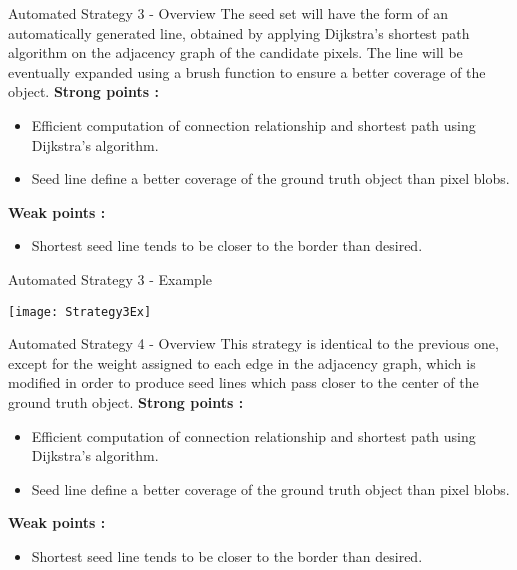 \begin{frame}[t,fragile]{Automated Strategy 3 - Overview}
The seed set will have the form of an automatically generated line, obtained by applying Dijkstra's shortest path algorithm on the adjacency graph of the candidate pixels.
The line will be eventually expanded using a brush function to ensure a better coverage of the object.\newline
\textbf{Strong points :}
\begin{itemize}
  \item Efficient computation of connection relationship and shortest path using Dijkstra's algorithm.
  \item Seed line define a better coverage of the ground truth object than pixel blobs.
\end{itemize}
\textbf{Weak points :}
\begin{itemize}
  \item Shortest seed line tends to be closer to the border than desired.
\end{itemize}
\end{frame}

\begin{frame}[t,fragile]{Automated Strategy 3 - Example}
\begin{center}
\texttt{[image: Strategy3Ex]}
\end{center}
\end{frame}

\begin{frame}[t,fragile]{Automated Strategy 4 - Overview}
This strategy is identical to the previous one, except for the weight assigned to each edge in the adjacency graph, which is modified in order to produce
seed lines which pass closer to the center of the ground truth object.\newline
\textbf{Strong points :}
\begin{itemize}
  \item Efficient computation of connection relationship and shortest path using Dijkstra's algorithm.
  \item Seed line define a better coverage of the ground truth object than pixel blobs.
\end{itemize}
\textbf{Weak points :}
\begin{itemize}
  \item Shortest seed line tends to be closer to the border than desired.
\end{itemize}
\end{frame}

